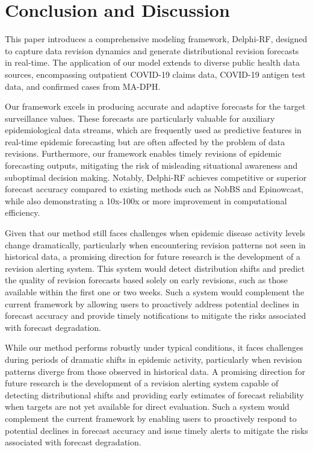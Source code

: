 \section{Conclusion and Discussion}
This paper introduces a comprehensive modeling framework, Delphi-RF, designed to capture data revision dynamics and generate distributional revision forecasts in real-time. The application of our model extends to diverse public health data sources, encompassing outpatient COVID-19 claims data, COVID-19 antigen test data, and confirmed cases from MA-DPH.

Our framework excels in producing accurate and adaptive forecasts for the target surveillance values. These forecasts are particularly valuable for auxiliary epidemiological data streams, which are frequently used as predictive features in real-time epidemic forecasting but are often affected by the problem of data revisions. Furthermore, our framework enables timely revisions of epidemic forecasting outputs, mitigating the risk of misleading situational awareness and suboptimal decision making. Notably, Delphi-RF achieves competitive or superior forecast accuracy compared to existing methods such as NobBS and Epinowcast, while also demonstrating a 10x-100x or more improvement in computational efficiency.

Given that our method still faces challenges when epidemic disease activity levels change dramatically, particularly when encountering revision patterns not seen in historical data, a promising direction for future research is the development of a revision alerting system. This system would detect distribution shifts and predict the quality of revision forecasts based solely on early revisions, such as those available within the first one or two weeks. Such a system would complement the current framework by allowing users to proactively address potential declines in forecast accuracy and provide timely notifications to mitigate the risks associated with forecast degradation.

While our method performs robustly under typical conditions, it faces challenges during periods of dramatic shifts in epidemic activity, particularly when revision patterns diverge from those observed in historical data. A promising direction for future research is the development of a revision alerting system capable of detecting distributional shifts and providing early estimates of forecast reliability when targets are not yet available for direct evaluation. Such a system would complement the current framework by enabling users to proactively respond to potential declines in forecast accuracy and issue timely alerts to mitigate the risks associated with forecast degradation.
